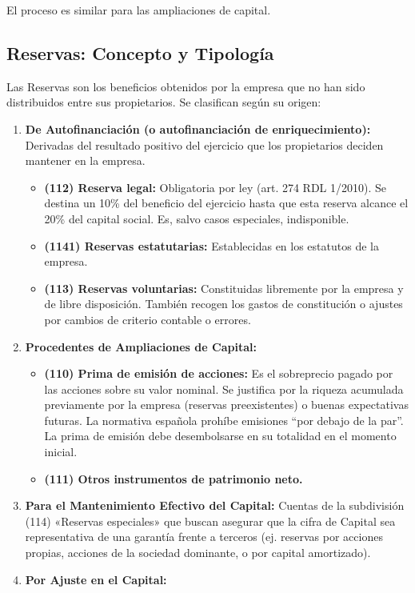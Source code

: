 \documentclass[
  paper=a4,
  ,captions=tableheading
]{scrbook}
\providecommand{\tightlist}{%
  \setlength{\itemsep}{0pt}\setlength{\parskip}{0pt}}
\begin{document}
El proceso es similar para las ampliaciones de capital.

\hypertarget{reservas-concepto-y-tipologuxeda}{%
\subsection{Reservas: Concepto y
Tipología}\label{reservas-concepto-y-tipologuxeda}}

Las Reservas son los beneficios obtenidos por la empresa que no han sido
distribuidos entre sus propietarios. Se clasifican según su origen:

\begin{enumerate}
\def\labelenumi{\arabic{enumi}.}
\tightlist
\item
  \textbf{De Autofinanciación (o autofinanciación de enriquecimiento):}
  Derivadas del resultado positivo del ejercicio que los propietarios
  deciden mantener en la empresa.

  \begin{itemize}
  \tightlist
  \item
    \textbf{(112) Reserva legal:} Obligatoria por ley (art. 274 RDL
    1/2010). Se destina un 10\% del beneficio del ejercicio hasta que
    esta reserva alcance el 20\% del capital social. Es, salvo casos
    especiales, indisponible.
  \item
    \textbf{(1141) Reservas estatutarias:} Establecidas en los estatutos
    de la empresa.
  \item
    \textbf{(113) Reservas voluntarias:} Constituidas libremente por la
    empresa y de libre disposición. También recogen los gastos de
    constitución o ajustes por cambios de criterio contable o errores.
  \end{itemize}
\item
  \textbf{Procedentes de Ampliaciones de Capital:}

  \begin{itemize}
  \tightlist
  \item
    \textbf{(110) Prima de emisión de acciones:} Es el sobreprecio
    pagado por las acciones sobre su valor nominal. Se justifica por la
    riqueza acumulada previamente por la empresa (reservas
    preexistentes) o buenas expectativas futuras. La normativa española
    prohíbe emisiones ``por debajo de la par''. La prima de emisión debe
    desembolsarse en su totalidad en el momento inicial.
  \item
    \textbf{(111) Otros instrumentos de patrimonio neto.}
  \end{itemize}
\item
  \textbf{Para el Mantenimiento Efectivo del Capital:} Cuentas de la
  subdivisión (114) «Reservas especiales» que buscan asegurar que la
  cifra de Capital sea representativa de una garantía frente a terceros
  (ej. reservas por acciones propias, acciones de la sociedad dominante,
  o por capital amortizado).
\item
  \textbf{Por Ajuste en el Capital:}


\end{enumerate}
\end{document}
